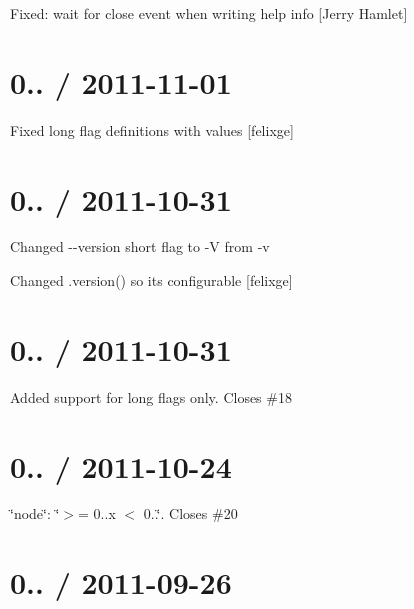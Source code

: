\begin{DoxyItemize}
\item Fixed\+: wait for close event when writing help info \mbox{[}Jerry Hamlet\mbox{]}
\end{DoxyItemize}

\section*{0.. / 2011-\/11-\/01 }


\begin{DoxyItemize}
\item Fixed long flag definitions with values \mbox{[}felixge\mbox{]}
\end{DoxyItemize}

\section*{0.. / 2011-\/10-\/31 }


\begin{DoxyItemize}
\item Changed {\ttfamily -\/-\/version} short flag to {\ttfamily -\/V} from {\ttfamily -\/v}
\item Changed {\ttfamily .version()} so it\textquotesingle{}s configurable \mbox{[}felixge\mbox{]}
\end{DoxyItemize}

\section*{0.. / 2011-\/10-\/31 }


\begin{DoxyItemize}
\item Added support for long flags only. Closes \#18
\end{DoxyItemize}

\section*{0.. / 2011-\/10-\/24 }


\begin{DoxyItemize}
\item \char`\"{}node\char`\"{}\+: \char`\"{}$>$= 0..\+x $<$ 0..\char`\"{}. Closes \#20
\end{DoxyItemize}

\section*{0.. / 2011-\/09-\/26 }


